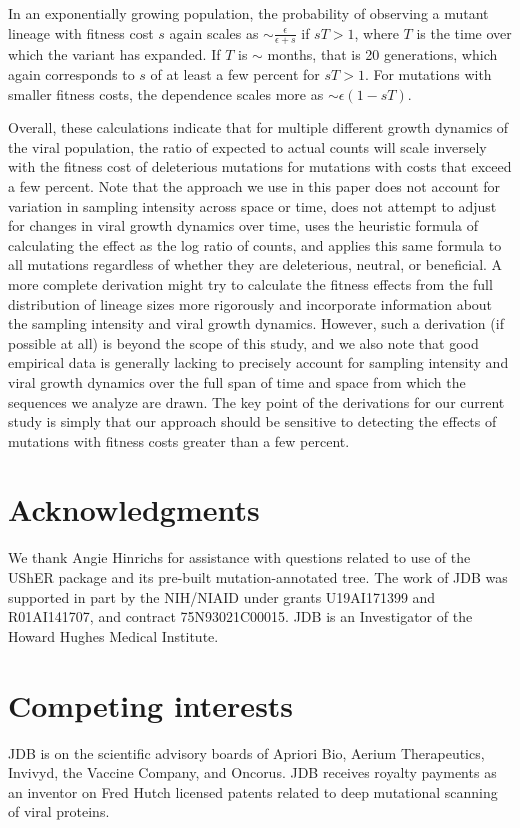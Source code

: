 \documentclass[9pt,twocolumn,twoside]{gsajnl_modified}
\begin{document}
{In an exponentially growing population, the probability of observing a mutant lineage with fitness cost $s$ again scales as $\sim \frac{\epsilon}{\epsilon + s}$ if $sT>1$, where $T$ is the time over which the variant has expanded.
If $T$ is $\sim$ months, that is 20 generations, which again corresponds to $s$ of at least a few percent for $sT > 1$.
For mutations with smaller fitness costs, the dependence scales more as $\sim \epsilon\left(1-sT\right)$.

Overall, these calculations indicate that for multiple different growth dynamics of the viral population, the ratio of expected to actual counts will scale inversely with the fitness cost of deleterious mutations for mutations with costs that exceed a few percent.
Note that the approach we use in this paper does not account for variation in sampling intensity across space or time, does not attempt to adjust for changes in viral growth dynamics over time, uses the heuristic formula of calculating the effect as the log ratio of counts, and applies this same formula to all mutations regardless of whether they are deleterious, neutral, or beneficial.
A more complete derivation might try to calculate the fitness effects from the full distribution of lineage sizes more rigorously and incorporate information about the sampling intensity and viral growth dynamics.
However, such a derivation (if possible at all) is beyond the scope of this study, and we also note that good empirical data is generally lacking to precisely account for sampling intensity and viral growth dynamics over the full span of time and space from which the sequences we analyze are drawn.
The key point of the derivations for our current study is simply that our approach should be sensitive to detecting the effects of mutations with fitness costs greater than a few percent.

\section{Acknowledgments}
We thank Angie Hinrichs for assistance with questions related to use of the UShER package and its pre-built mutation-annotated tree.
The work of JDB was supported in part by the NIH/NIAID under grants U19AI171399 and R01AI141707, and contract 75N93021C00015.
JDB is an Investigator of the Howard Hughes Medical Institute.

\section{Competing interests}
JDB is on the scientific advisory boards of Apriori Bio, Aerium Therapeutics, Invivyd, the Vaccine Company, and Oncorus.
JDB receives royalty payments as an inventor on Fred Hutch licensed patents related to deep mutational scanning of viral proteins.


}
\end{document}
